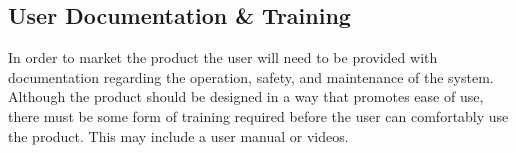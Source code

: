 \documentclass[titlepage]{article}
\begin{document}
\subsection{User Documentation \& Training}
In order to market the product the user will need to be provided with documentation regarding the operation, safety, and maintenance of the system. Although the product should be designed in a way that promotes ease of use, there must be some form of training required before the user can comfortably use the product. This may include a user manual or videos.




\pagebreak
\printindex
\end{document}
